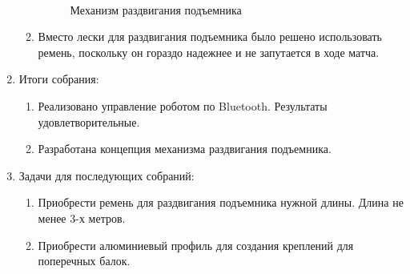 \begin{enumerate}
\begin{enumerate}
      \begin{figure}[H]
      	\begin{minipage}[h]{0.2\linewidth}
      		\center  
      	\end{minipage}
      	\begin{minipage}[h]{0.6\linewidth}
      		\caption{Механизм раздвигания подъемника}
      	\end{minipage}
      \end{figure}
        
      \item Вместо лески для раздвигания подъемника было решено использовать ремень, поскольку он гораздо надежнее и не запутается в ходе матча.
      
    \end{enumerate}
    
	\item Итоги собрания: 
	\begin{enumerate}
	  \item  Реализовано управление роботом по Bluetooth. Результаты удовлетворительные.
	  
      \item  Разработана концепция механизма раздвигания подъемника.
      
    \end{enumerate}
    
	\item Задачи для последующих собраний:
	\begin{enumerate}
	  \item Приобрести ремень для раздвигания подъемника нужной длины. Длина не менее 3-х метров.
	  
	  \item Приобрести алюминиевый профиль для создания креплений для поперечных балок.
	  
    \end{enumerate}     
\end{enumerate}
\fillpage
